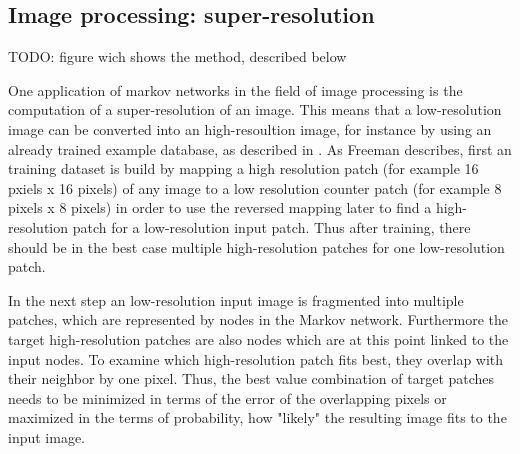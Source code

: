 \subsection{Image processing: super-resolution}
\label{sec:image}

TODO: figure wich shows the method, described below

One application of markov networks in the field of image processing is the computation of a super-resolution of an image. This means that a low-resolution image can be converted into an high-resoultion image, for instance by using an already trained example database, as described in \cite{freeman2002example}. As Freeman describes, first an training dataset is build by mapping a high resolution patch (for example 16 pxiels x 16 pixels) of any image to a low resolution counter patch (for example 8 pixels x 8 pixels) in order to use the reversed mapping later to find a high-resolution patch for a low-resolution input patch. Thus after training, there should be in the best case multiple high-resolution patches for one low-resolution patch.

In the next step an low-resolution input image is fragmented into multiple patches, which are represented by nodes in the Markov network. Furthermore the target high-resolution patches are also nodes which are at this point linked to the input nodes. To examine which high-resolution patch fits best, they overlap with their neighbor by one pixel. Thus, the best value combination of target patches needs to be minimized in terms of the error of the overlapping pixels or maximized in the terms of probability, how "likely" the resulting image fits to the input image.
